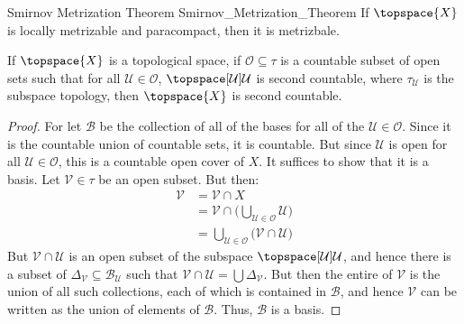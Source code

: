 \documentclass{article}                                                        %
\begin{document}
            \begin{ftheorem}{Smirnov Metrization Theorem}
                            {Smirnov_Metrization_Theorem}
                If $\topspace{X}$ is locally metrizable and paracompact, then it is
                metrizbale.
            \end{ftheorem}
            \begin{theorem}
                \label{thm:Count_Open_Cover_of_Sec_Count_Implies_Sec_Count}%
                If $\topspace{X}$ is a topological space, if
                $\mathcal{O}\subseteq\tau$ is a countable subset of open sets such
                that for all $\mathcal{U}\in\mathcal{O}$,
                $\topspace[\mathcal{U}]{\mathcal{U}}$ is second countable, where
                $\tau_{\mathcal{U}}$ is the subspace topology, then $\topspace{X}$
                is second countable.
            \end{theorem}
            \begin{proof}
                For let $\mathcal{B}$ be the collection of all of the bases for all
                of the $\mathcal{U}\in\mathcal{O}$. Since it is the countable union
                of countable sets, it is countable. But since $\mathcal{U}$ is open
                for all $\mathcal{U}\in\mathcal{O}$, this is a countable open cover
                of $X$. It suffices to show that it is a basis. Let
                $\mathcal{V}\in\tau$ be an open subset. But then:
                \begin{align}
                    \mathcal{V}&=\mathcal{V}\cap{X}\\
                    &=\mathcal{V}\cap\Big(
                        \bigcup_{\mathcal{U}\in\mathcal{O}}\mathcal{U}
                    \Big)\\
                    &=\bigcup_{\mathcal{U}\in\mathcal{O}}
                        \big(\mathcal{V}\cap\mathcal{U}\big)
                \end{align}
                But $\mathcal{V}\cap\mathcal{U}$ is an open subset of the subspace
                $\topspace[\mathcal{U}]{\mathcal{U}}$, and hence there is a subset
                of $\Delta_{\mathcal{V}}\subseteq\mathcal{B}_{\mathcal{U}}$ such
                that $\mathcal{V}\cap\mathcal{U}=\bigcup\Delta_{\mathcal{V}}$. But
                then the entire of $\mathcal{V}$ is the union of all such
                collections, each of which is contained in $\mathcal{B}$, and hence
                $\mathcal{V}$ can be written as the union of elements of
                $\mathcal{B}$. Thus, $\mathcal{B}$ is a basis.
            \end{proof}
\end{document}
